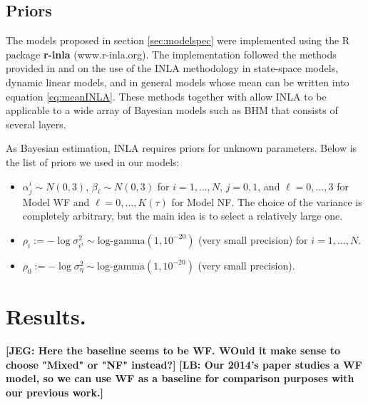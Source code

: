 \documentclass[12pt]{amsart}
\theoremstyle{plain}
\theoremstyle{definition}
\theoremstyle{remark}
\newcommand{\lb}[1]{\color{MidnightBlue}\textbf{[LB: #1]}\normalcolor}
\newcommand{\jeg}[1]{\color{ProcessBlue}\textbf{[JEG: #1]}\normalcolor}
\begin{document}
\subsection{Priors}
The models proposed in section \ref{sec:modelspec} were
implemented using the R package \textbf{r-inla} (www.r-inla.org). The
implementation followed the methods provided in \cite{Ruiz-Cardenas2012} and
\cite{Muff2015} on the use of the INLA methodology in state-space models,
dynamic linear models, and in general models whose mean can be written
into equation \eqref{eq:meanINLA}. These
methods together with \cite{Martins2013} allow INLA to be applicable to a wide array of Bayesian models such as BHM that consists of several layers. 

As Bayesian estimation, INLA requires priors for unknown parameters. Below is the list of priors we used in our models:
\begin{itemize}
\item $\alpha^i_j\sim N(0,3)$, $\beta_\ell \sim N(0,3)$ for $i=1,\ldots,N$, $j=0,1$, and  $\ell=0,\ldots,3$
  for Model WF and $\ell=0,\ldots,K(\tau)$ for Model NF. The choice of the variance is
  completely arbitrary, but the main idea is to select a relatively large one.
  
\item $\rho_i := -\log \sigma^2_{\epsilon^i}\sim \text{log-gamma}(1,10^{-20})$
  (very small precision) for $i=1,\ldots,N$.
  
\item $\rho_0 := -\log \sigma^2_\eta \sim \text{log-gamma}(1,10^{-20})$ (very
  small precision).
\end{itemize}


\section{Results.}
\label{sec:results}
\jeg{Here the baseline seems to be WF. WOuld it make sense to choose "Mixed" or
  "NF" instead?} \lb{Our 2014's paper studies a WF model, so we can use WF as a baseline for comparison purposes with our previous work.}
\end{document}

